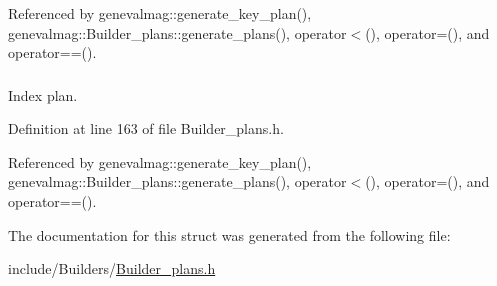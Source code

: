 Referenced by genevalmag::generate\_\-key\_\-plan(), genevalmag::Builder\_\-plans::generate\_\-plans(), operator$<$(), operator=(), and operator==().

\hypertarget{structgenevalmag_1_1k__plan_ac948a26cdaa4b9ea54cc04ac27c99e3c}{
\subsubsection[{plan}]{}}
\label{structgenevalmag_1_1k__plan_ac948a26cdaa4b9ea54cc04ac27c99e3c}


Index plan. 



Definition at line 163 of file Builder\_\-plans.h.



Referenced by genevalmag::generate\_\-key\_\-plan(), genevalmag::Builder\_\-plans::generate\_\-plans(), operator$<$(), operator=(), and operator==().



The documentation for this struct was generated from the following file:\begin{DoxyCompactItemize}
\item 
include/Builders/\hyperlink{Builder__plans_8h}{Builder\_\-plans.h}\end{DoxyCompactItemize}

